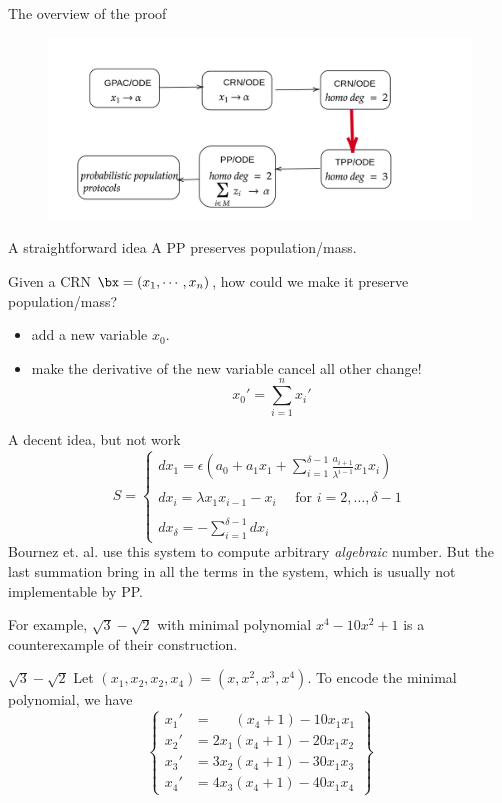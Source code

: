 \documentclass[aspectratio=169]{beamer}
\begin{document}
\begin{frame}{The overview of the proof}
    \begin{figure}[tb]
        \centering
        \includegraphics[scale=0.25]{flow2}
    \end{figure}
\end{frame}

\begin{frame}{A straightforward idea}
    A PP preserves population/mass.

    \begin{quest}
        Given a CRN $\bx=(x_1,\cdots, x_n)$, how could we make it preserve population/mass?
    \end{quest}\pause
    \begin{itemize}
        \item add a new variable $x_0$. \pause
        \item make the derivative of the new variable cancel all other change!
        \[
            x_0' = \sum_{i=1}^{n}x_i'
        \]
    \end{itemize}
\end{frame}
\begin{frame}[Clean]{A decent idea, but not work}
    $$ S= \begin{cases} dx_1 = \epsilon (a_0 + a_1 x_1 +\sum_{i=1}^{\delta-1}\frac{a_{i+1}}{\lambda^{i-1}}x_1x_i) \\ \\  dx_i = \lambda x_1 x_{i-1}-x_i \quad\text{ for } i=2,\dots,\delta-1           \\ \\ dx_\delta = -\sum_{i=1}^{\delta-1}dx_i \end{cases}$$\pause
    Bournez et. al. use this system to compute arbitrary \emph{algebraic} number. But the last summation bring in all the terms in the system, which is usually not implementable by PP.

    For example, $\sqrt{3}-\sqrt{2} $ with minimal polynomial $x^4-10x^2+1$ is a counterexample of their construction.
\end{frame}
\begin{frame}{$\sqrt{3}-\sqrt{2}$ }
    Let $(x_1,x_2,x_2,x_4)=(x,x^2,x^3,x^4)$. To encode the minimal polynomial, we have
    \[
        \left\{\begin{matrix}
x_1' &=  \;\;\;\;\;\, (x_4+1) - 10 x_1x_1
\\
x_2'&=  2x_1 ( x_4 + 1) -20x_1x_2
\\
x_3 ' &=  3x_2 ( x_4 + 1) -30x_1x_3
\\
x_4'  &=  4x_3 ( x_4 + 1) -40x_1x_4
\end{matrix}\right\}
    \]
\end{frame}
\end{document}
